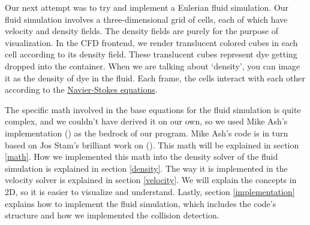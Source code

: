 \documentclass[a4paper,12pt,titlepage]{article}
\begin{document}
\noindent
\begin{minipage}[t]{0.65\textwidth}
	Our next attempt was to try and implement a Eulerian fluid simulation.
	Our fluid simulation involves a three-dimensional grid of cells, each of which
	have velocity and density fields. The density fields are purely for the purpose
	of visualization. In the CFD frontend, we render translucent colored cubes in
	each cell according to its density field. These translucent cubes represent
	dye getting dropped into the container. When we are talking about `density',
	you can image it as the density of dye in the fluid. Each frame, the cells
	interact with each other according to the \href{https://en.wikipedia.org/wiki/Navier%E2%80%93Stokes_equations}{Navier-Stokes equations}.
	\end{minipage}\hfill
	\begin{minipage}[t]{0.3\textwidth}
		\vspace{4pt}
		\centering{}
	\end{minipage}

The specific math involved in the base equations for the fluid simulation is
quite complex, and we couldn't have derived it on our own, so we used
Mike Ash's implementation \href{www.mikeash.com/pyblog/fluid-simulation-for-dummies.html}{} (\cite{mikeash})
as the bedrock of our program. Mike Ash's code is in turn based on Jos Stam's
brilliant work on \href{www.dgp.toronto.edu/public_user/stam/reality/Research/pdf/GDC03.pdf}{} (\cite{josstam}).
This math will be explained in section \ref{math}. 
How we implemented this math into the density solver of the fluid simulation is explained in section \ref{density}.
The way it is implemented in the velocity solver is explained in section \ref{velocity}.
We will explain the concepts in 2D, so it is easier to visualize and understand.
Lastly, section \ref{implementation} explains how to implement the fluid simulation,
which includes the code's structure and how we implemented the collision detection.
\end{document}
